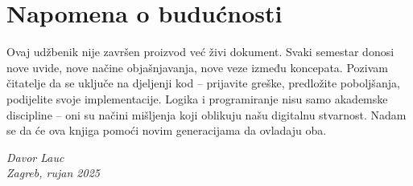 \section*{Napomena o budućnosti}

Ovaj udžbenik nije završen proizvod već živi dokument. Svaki semestar donosi nove uvide, nove načine objašnjavanja,
nove veze između koncepata.
Pozivam čitatelje da se uključe na djeljenji kod – prijavite greške, predložite poboljšanja, podijelite svoje implementacije.
Logika i programiranje nisu samo akademske discipline – oni su načini mišljenja koji oblikuju našu digitalnu stvarnost.
Nadam se da će ova knjiga pomoći novim generacijama da ovladaju oba.

\vspace{1cm}
\begin{flushright}
\textit{Davor Lauc}\\
\textit{Zagreb, rujan 2025}
\end{flushright}
